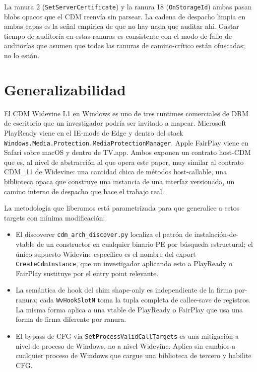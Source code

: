 \documentclass[11pt,letterpaper]{article}
\let\oldsection\section
\renewcommand{\section}{\clearpage\oldsection}
\begin{document}
La ranura 2 (\texttt{SetServerCertificate}) y la ranura 18
(\texttt{OnStorageId}) ambas pasan blobs opacos que el CDM
reenvía sin parsear. La cadena de despacho limpia en ambas capas
es la señal empírica de que no hay nada que auditar ahí. Gastar
tiempo de auditoría en estas ranuras es consistente con el modo
de fallo de auditorías que asumen que todas las ranuras de
camino-crítico están ofuscadas; no lo están.

\section{Generalizabilidad}
\label{sec:generalisability}

El CDM Widevine L1 en Windows es uno de tres runtimes comerciales
de DRM de escritorio que un investigador podría ser invitado a
mapear. Microsoft PlayReady viene en el IE-mode de Edge y dentro
del stack
\texttt{Windows.Media.Protection.MediaProtectionManager}. Apple
FairPlay viene en Safari sobre macOS y dentro de TV.app. Ambos
exponen un contrato host-CDM que es, al nivel de abstracción al
que opera este paper, muy similar al contrato CDM\_11 de
Widevine: una cantidad chica de métodos host-callable, una
biblioteca opaca que construye una instancia de una interfaz
versionada, un camino interno de despacho que hace el trabajo
real.

La metodología que liberamos está parametrizada para que
generalice a estos targets con mínima modificación:

\begin{itemize}[itemsep=2pt]
  \item El discoverer \texttt{cdm\_arch\_discover.py} localiza
        el patrón de instalación-de-vtable de un constructor en
        cualquier binario PE por búsqueda estructural; el único
        supuesto Widevine-específico es el nombre del export
        \texttt{CreateCdmInstance}, que un investigador
        aplicando esto a PlayReady o FairPlay sustituye por el
        entry point relevante.
  \item La semántica de hook del shim shape-only es
        independiente de la firma por-ranura; cada
        \texttt{WvHookSlotN} toma la tupla completa de
        callee-save de registros. La misma forma aplica a una
        vtable de PlayReady o FairPlay que usa una forma de
        firma diferente por ranura.
  \item El bypass de CFG vía \texttt{SetProcessValidCallTargets}
        es una mitigación a nivel de proceso de Windows, no a
        nivel Widevine. Aplica sin cambios a cualquier proceso
        de Windows que cargue una biblioteca de tercero y
        habilite CFG.
\end{itemize}
\end{document}
